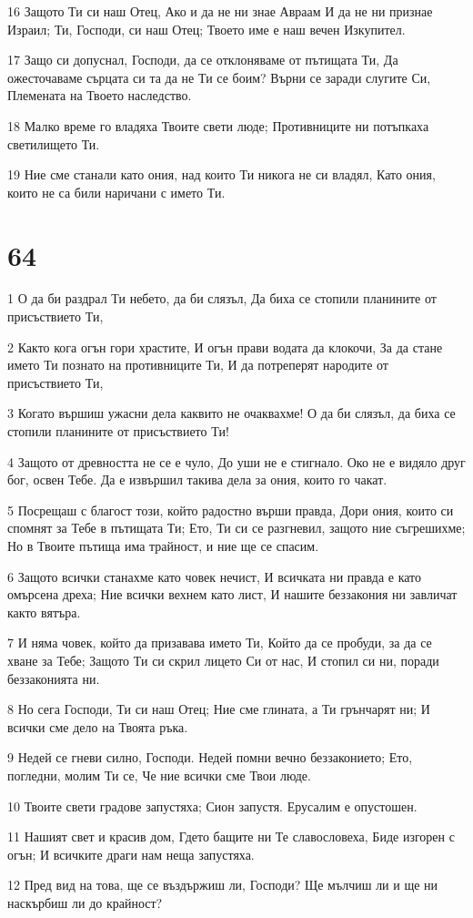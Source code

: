 \par 16 Защото Ти си наш Отец, Ако и да не ни знае Авраам И да не ни признае Израил; Ти, Господи, си наш Отец; Твоето име е наш вечен Изкупител.
\par 17 Защо си допуснал, Господи, да се отклоняваме от пътищата Ти, Да ожесточаваме сърцата си та да не Ти се боим? Върни се заради слугите Си, Племената на Твоето наследство.
\par 18 Малко време го владяха Твоите свети люде; Противниците ни потъпкаха светилището Ти.
\par 19 Ние сме станали като ония, над които Ти никога не си владял, Като ония, които не са били наричани с името Ти.

\chapter{64}

\par 1 О да би раздрал Ти небето, да би слязъл, Да биха се стопили планините от присъствието Ти,
\par 2 Както кога огън гори храстите, И огън прави водата да клокочи, За да стане името Ти познато на противниците Ти, И да потреперят народите от присъствието Ти,
\par 3 Когато вършиш ужасни дела каквито не очаквахме! О да би слязъл, да биха се стопили планините от присъствието Ти!
\par 4 Защото от древността не се е чуло, До уши не е стигнало. Око не е видяло друг бог, освен Тебе. Да е извършил такива дела за ония, които го чакат.
\par 5 Посрещаш с благост този, който радостно върши правда, Дори ония, които си спомнят за Тебе в пътищата Ти; Ето, Ти си се разгневил, защото ние съгрешихме; Но в Твоите пътища има трайност, и ние ще се спасим.
\par 6 Защото всички станахме като човек нечист, И всичката ни правда е като омърсена дреха; Ние всички вехнем като лист, И нашите беззакония ни завличат както вятъра.
\par 7 И няма човек, който да призавава името Ти, Който да се пробуди, за да се хване за Тебе; Защото Ти си скрил лицето Си от нас, И стопил си ни, поради беззаконията ни.
\par 8 Но сега Господи, Ти си наш Отец; Ние сме глината, а Ти грънчарят ни; И всички сме дело на Твоята ръка.
\par 9 Недей се гневи силно, Господи. Недей помни вечно беззаконието; Ето, погледни, молим Ти се, Че ние всички сме Твои люде.
\par 10 Твоите свети градове запустяха; Сион запустя. Ерусалим е опустошен.
\par 11 Нашият свет и красив дом, Гдето бащите ни Те славословеха, Биде изгорен с огън; И всичките драги нам неща запустяха.
\par 12 Пред вид на това, ще се въздържиш ли, Господи? Ще мълчиш ли и ще ни наскърбиш ли до крайност?

